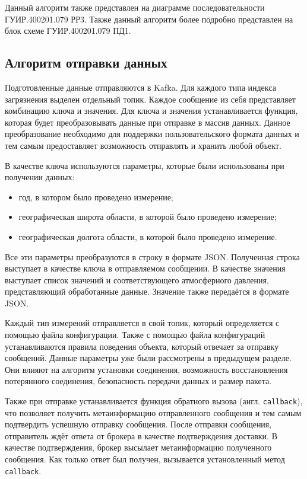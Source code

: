 Данный алгоритм также представлен на диаграмме последовательности ГУИР.400201.079 РР3.
Также данный алгоритм  более подробно представлен на блок схеме ГУИР.400201.079 ПД1.


\subsection{Алгоритм отправки данных}

Подготовленные данные отправляются в Kafka.
Для каждого типа индекса загрязнения выделен отдельный топик.
Каждое сообщение из себя представляет комбинацию ключа и значения.
Для ключа и значения устанавливается функция, которая будет преобразовывать данные при отправке в массив данных.
Данное преобразование необходимо для поддержки пользовательского формата данных и тем самым предоставляет возможность отправлять и хранить любой объект.

В качестве ключа используются параметры, которые были использованы при получении данных:
\begin{itemize}
    \item год, в котором было проведено измерение;
    \item географическая широта области, в которой было проведено измерение;
    \item географическая долгота области, в которой было проведено измерение.
\end{itemize}

Все эти параметры преобразуются в строку в формате JSON.
Полученная строка выступает в качестве ключа в отправляемом сообщении.
В качестве значения выступает список значений и соответствующего атмосферного давления, представляющий обработанные данные.
Значение также передаётся в формате JSON.

Каждый тип измерений отправляется в свой топик, который определяется с помощью файла конфигурации.
Также с помощью файла конфигураций устанавливаются правила поведения объекта, который отвечает за отправку сообщений.
Данные параметры уже были рассмотрены в предыдущем разделе.
Они влияют на алгоритм установки соединения, возможность восстановления потерянного соединения, безопасность передачи данных и размер пакета.

Также при отправке устанавливается функция обратного вызова (англ. \texttt{callback}), что позволяет получить метаинформацию отправленного сообщения и тем самым подтвердить успешную отправку сообщения.
После отправки сообщения, отправитель ждёт ответа от брокера в качестве подтверждения доставки.
В качестве подтверждения, брокер высылает метаинформацию полученного сообщения.
Как только ответ был получен, вызывается установленный метод \texttt{callback}.

